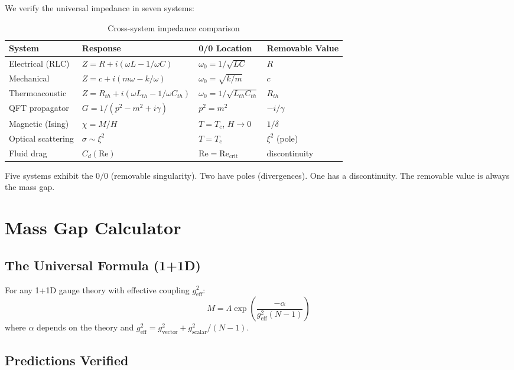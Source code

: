 \documentclass[11pt]{article}
\begin{document}
We verify the universal impedance in seven systems:

\begin{table}[h]
\centering
\caption{Cross-system impedance comparison}
\begin{tabular}{@{}llll@{}}
\toprule
System & Response & 0/0 Location & Removable Value \\
\midrule
Electrical (RLC) & $Z = R + i(\omega L - 1/\omega C)$ & $\omega_0 = 1/\sqrt{LC}$ & $R$ \\
Mechanical & $Z = c + i(m\omega - k/\omega)$ & $\omega_0 = \sqrt{k/m}$ & $c$ \\
Thermoacoustic & $Z = R_{th} + i(\omega L_{th} - 1/\omega C_{th})$ & $\omega_0 = 1/\sqrt{L_{th}C_{th}}$ & $R_{th}$ \\
QFT propagator & $G = 1/(p^2 - m^2 + i\gamma)$ & $p^2 = m^2$ & $-i/\gamma$ \\
Magnetic (Ising) & $\chi = M/H$ & $T = T_c$, $H \to 0$ & $1/\delta$ \\
Optical scattering & $\sigma \sim \xi^2$ & $T = T_c$ & $\xi^2$ (pole) \\
Fluid drag & $C_d(\mathrm{Re})$ & $\mathrm{Re} = \mathrm{Re}_{\text{crit}}$ & discontinuity \\
\bottomrule
\end{tabular}
\end{table}

Five systems exhibit the $0/0$ (removable singularity). Two have poles (divergences). One has a discontinuity. The removable value is always the mass gap.

\section{Mass Gap Calculator}

\subsection{The Universal Formula (1+1D)}

For any 1+1D gauge theory with effective coupling $g_{\text{eff}}^2$:
\begin{equation}
    M = \Lambda \exp\!\left(\frac{-\alpha}{g_{\text{eff}}^2 (N-1)}\right)
\end{equation}
where $\alpha$ depends on the theory and $g_{\text{eff}}^2 = g_{\text{vector}}^2 + g_{\text{scalar}}^2/(N-1)$.

\subsection{Predictions Verified}
\end{document}
